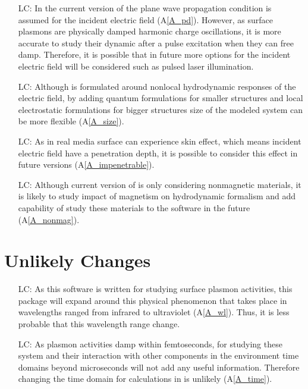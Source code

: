 \documentclass[12pt]{article}
\newcounter{lcnum} %
\begin{document}
\noindent \begin{itemize}

\item[LC\refstepcounter{lcnum}\thelcnum\label{LC_lightsource}:] In the current version of the \progname{} plane wave propagation condition is assumed for the incident electric field (A\ref{A_pd}). However, as surface plasmons are physically damped harmonic charge oscillations, it is more accurate to study their dynamic after a pulse excitation when they can free damp. Therefore, it is possible that in future more options for the incident electric field will be considered such as pulsed laser illumination.  

\item[LC\refstepcounter{lcnum}\thelcnum\label{LC_size}:] Although \progname{} is formulated around nonlocal hydrodynamic responses of the electric field, by adding quantum formulations for smaller structures and local electrostatic formulations for bigger structures size of the modeled system can be more flexible (A\ref{A_size}). 


\item[LC\refstepcounter{lcnum}\thelcnum\label{LC_skineffect}:] As in real media surface can experience skin effect, which means incident electric field have a penetration depth, it is possible to consider this effect in future versions (A\ref{A_impenetrable}). 

\item[LC\refstepcounter{lcnum}\thelcnum\label{LC_magnetism}:] Although current version of \progname{} is only considering nonmagnetic materials, it is likely to study impact of magnetism on hydrodynamic formalism and add capability of study these materials to the software in the future (A\ref{A_nonmag}).

\end{itemize}

\section{Unlikely Changes}    

\noindent \begin{itemize}

\item[LC\refstepcounter{lcnum}\thelcnum\label{LC_wavelength}:] As this software is written for studying surface plasmon activities, this package will expand around this physical phenomenon that takes place in wavelengths ranged from infrared to ultraviolet (A\ref{A_wl}). Thus, it is less probable that this wavelength range change.  

\item[LC\refstepcounter{lcnum}\thelcnum\label{LC_time}:] As plasmon activities damp within femtoseconds, for studying these system and their interaction with other components in the environment time domains beyond microseconds will not add any useful information. Therefore changing the time domain for calculations in is unlikely (A\ref{A_time}). 

\end{itemize}
\end{document}
